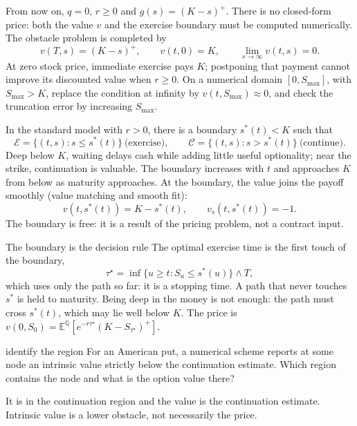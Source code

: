 \documentclass[10pt]{article}
\newcommand{\E}{\mathbb E}
\newcommand{\Q}{\mathbb Q}
\newcommand{\1}{\mathbf 1}
\theoremstyle{definition}
\begin{document}
From now on, \(q=0\), \(r\geq0\) and \(g(s)=(K-s)^+\). There is no
closed-form price: both the value \(v\) and the exercise boundary must be
computed numerically. The obstacle problem is completed by
\[
v(T,s)=(K-s)^+,\qquad v(t,0)=K,\qquad
\lim_{s\to\infty}v(t,s)=0.
\]
At zero stock price, immediate exercise pays \(K\); postponing that payment
cannot improve its discounted value when \(r\geq0\). On a numerical domain
\([0,S_{\max}]\), with \(S_{\max}>K\), replace the condition at infinity
by \(v(t,S_{\max})\approx0\), and check the truncation error by increasing
\(S_{\max}\).

In the standard model with \(r>0\), there is a boundary \(s^*(t)<K\) such that
\[
\mathcal E=\{(t,s):s\leq s^*(t)\}\ \text{(exercise)},\qquad
\mathcal C=\{(t,s):s>s^*(t)\}\ \text{(continue)}.
\]
Deep below \(K\), waiting delays cash while adding little useful
optionality; near the strike, continuation is valuable. The boundary
increases with \(t\) and approaches \(K\) from below as maturity approaches.
At the boundary, the value joins the payoff smoothly (value matching and
smooth fit):
\[
\boxed{v(t,s^*(t))=K-s^*(t),\qquad v_s(t,s^*(t))=-1.}
\]
The boundary is free: it is a result of the pricing problem, not a contract
input.

\begin{keyidea}{The boundary is the decision rule}
The optimal exercise time is the first touch of the boundary,
\[
\tau^\star=\inf\{u\geq t:S_u\leq s^*(u)\}\wedge T,
\]
which uses only the path so far: it is a stopping time. A path that never
touches \(s^*\) is held to maturity. Being deep in the money is not enough:
the path must cross \(s^*(t)\), which may lie well below \(K\). The price is
\(v(0,S_0)=\E^\Q[e^{-r\tau^\star}(K-S_{\tau^\star})^+]\).
\end{keyidea}

\begin{studentexercise}{identify the region}
For an American put, a numerical scheme reports at some node an intrinsic
value strictly below the continuation estimate. Which region contains the
node and what is the option value there?
\end{studentexercise}
\begin{shortsolution}
It is in the continuation region and the value is the continuation estimate.
Intrinsic value is a lower obstacle, not necessarily the price.
\end{shortsolution}

\end{document}
